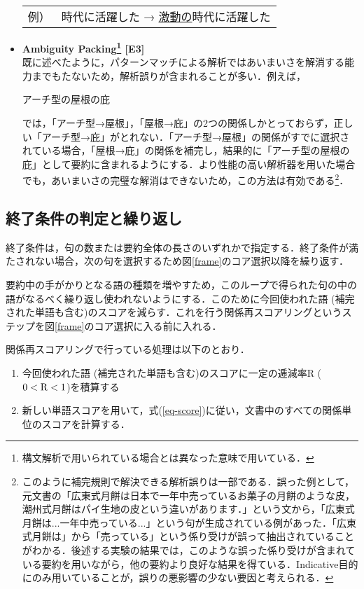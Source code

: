 \begin{itemize}
\begin{tabular}{ll}
例）&  時代に活躍した → \underline{激動の}時代に活躍した \\
\end{tabular}
 \item {\bf Ambiguity Packing\footnote{構文解析で用いられている場合とは異なった意味で用いている．} [E3]} \\
既に述べたように，パターンマッチによる解析ではあいまいさを解消する能力までもたないため，解析誤りが含まれることが多い．例えば，
\begin{center}
 アーチ型の屋根の庇
\end{center}
では，「アーチ型→屋根」，「屋根→庇」の2つの関係しかとっておらず，正しい「アーチ型→庇」がとれない．「アーチ型→屋根」の関係がすでに選択されている場合，「屋根→庇」の関係を補完し，結果的に「アーチ型の屋根の庇」として要約に含まれるようにする．より性能の高い解析器を用いた場合でも，あいまいさの完璧な解消はできないため，この方法は有効である\footnote{このように補完規則で解決できる解析誤りは一部である．誤った例として，元文書の「広東式月餅は日本で一年中売っているお菓子の月餅のような皮， 潮州式月餅はパイ生地の皮という違いがあります．」という文から，「広東式月餅は...一年中売っている...」という句が生成されている例があった．「広東式月餅は」から「売っている」という係り受けが誤って抽出されていることがわかる．後述する実験の結果では，このような誤った係り受けが含まれている要約を用いながら，他の要約より良好な結果を得ている．Indicative目的にのみ用いていることが，誤りの悪影響の少ない要因と考えられる．}．
\end{itemize}

\subsection{終了条件の判定と繰り返し}
終了条件は，句の数または要約全体の長さのいずれかで指定する．終了条件が満たされない場合，次の句を選択するため図\ref{frame}のコア選択以降を繰り返す．

要約中の手がかりとなる語の種類を増やすため，このループで得られた句の中の語がなるべく繰り返し使われないようにする．このために今回使われた語 (補完された単語も含む)のスコアを減らす．これを行う関係再スコアリングというステップを図\ref{frame}のコア選択に入る前に入れる．

関係再スコアリングで行っている処理は以下のとおり．

\begin{enumerate}
 \item 今回使われた語 (補完された単語も含む)のスコアに一定の逓減率R ($0 < {\rm R} < 1$)を積算する
 \item 新しい単語スコアを用いて，式(\ref{eq-score})に従い，文書中のすべての関係単位のスコアを計算する．
\end{enumerate}

